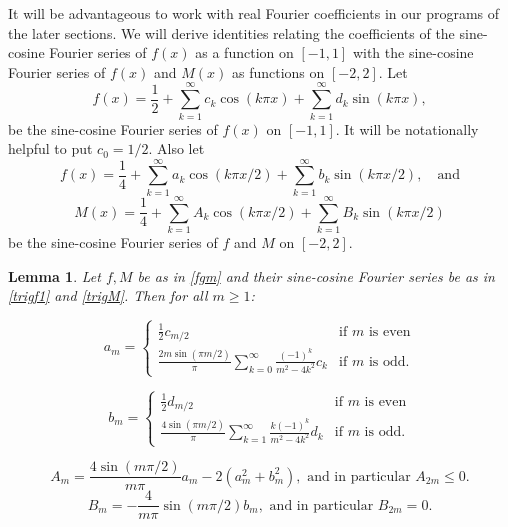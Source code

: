 \documentclass[12pt]{article}
\newtheorem{lemma}[theorem]{Lemma}
\numberwithin{equation}{section}
\begin{document}
It will be advantageous to work with real Fourier coefficients in our programs of the later sections. We will derive identities relating the coefficients of the sine-cosine Fourier series of $f(x)$ as a function on $[-1,1]$ with the sine-cosine Fourier series of $f(x)$ and $M(x)$ as functions on $[-2,2]$. Let 
\begin{equation}\label{trigf1} f(x) = \frac{1}{2} + \sum_{k =1}^\infty c_k \cos (k \pi x ) +\sum_{k =1}^\infty d_k \sin (k \pi x ) , \end{equation}
be the sine-cosine Fourier series of $f(x)$ on $[-1,1]$. It will be notationally helpful to put $c_0 = 1/2$. Also let
\[ f(x) = \frac{1}{4} + \sum_{k =1}^\infty a_k \cos (k \pi x/2 ) +\sum_{k =1}^\infty b_k \sin (k \pi x/2 ) , \quad \text{and}\]
\begin{equation}\label{trigM} M(x) = \frac{1}{4} + \sum_{k =1}^\infty A_k \cos (k \pi x/2 ) +\sum_{k =1}^\infty B_k \sin (k \pi x/2 ) \end{equation}
be the sine-cosine Fourier series of $f$ and $M$ on $[-2,2]$. 



\begin{lemma}\label{fourel} Let $f,M$ be as in \eqref{fgm} and their sine-cosine Fourier series be as in \eqref{trigf1} and \eqref{trigM}. Then for all $m \geq 1$:

\begin{equation}\label{am} a_m = \begin{cases} \frac{1}{2}c_{m/2} & \text{if }m \text{ is even} \\ 
\frac{2m\sin(\pi m/2)}{\pi} \sum_{k=0}^\infty \frac{(-1)^k }{m^2-4k^2} c_k & \text{if }m \text{ is odd.} \end{cases}\end{equation}

\begin{equation}\label{bm} b_m = \begin{cases} \frac{1}{2}d_{m/2} & \text{if }m \text{ is even} \\ 
\frac{4\sin(\pi m/2)}{\pi} \sum_{k=1}^\infty \frac{k(-1)^k }{m^2-4k^2} d_k & \text{if }m \text{ is odd.} \end{cases}\end{equation}

\begin{equation}\label{Am} A_m = \frac{4 \sin \left(m\pi /2 \right)}{m \pi}  a_m - 2(a_m^2+b_m^2), \text{ and in particular } A_{2m} \leq 0.\end{equation}
\begin{equation}\label{Bm} B_m = -\frac{4}{m \pi}\sin\left( m\pi /2 \right) b_m, \text{ and in particular } B_{2m} = 0.\end{equation}

\end{lemma}
\end{document}
